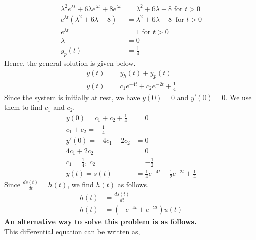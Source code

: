 \documentclass[10pt,a4paper, margin=1in]{article}
\begin{document}
\begin{enumerate}
\begin{enumerate}
\begin{equation}
\begin{split}
		\lambda^2 e^{\lambda t} + 6\lambda e^{\lambda t} + 8 e^{\lambda t}  & = \lambda^2 + 6\lambda + 8 \text{ for } t > 0\\
		e^{\lambda t}(\lambda^2  + 6\lambda + 8) & = \lambda^2 + 6\lambda + 8\ \text{ for } t > 0\\
		e^{\lambda t} & = 1 \text{ for } t > 0\\
		\lambda & = 0 \\
		y_p(t) & = \frac{1}{4} 
	\end{split}
	\end{equation}
	Hence, the general solution is given below.
    	\begin{equation}
	\begin{split}
		y(t) & = y_h(t) + y_p(t)\\
		y(t) & = c_1 e^{-4 t} + c_2 e^{-2 t} + \frac{1}{4}
	\end{split}
	\end{equation}
	Since the system is initially at rest, we have $y(0) = 0$ and $y'(0) = 0$. We use them to find $c_1$ and $c_2$.
    	\begin{equation}
	\begin{split}
		y(0) = c_1 + c_2 + \frac{1}{4} & = 0\\
		c_1 + c_2 = -\frac{1}{4}\\
		y'(0) = -4c_1 - 2c_2 & = 0\\
		4c_1 + 2c_2 & = 0\\
		c_1 = \frac{1}{4}, \ c_2 & = -\frac{1}{2}\\
		y(t) = s(t) & = \frac{1}{4} e^{-4 t} - \frac{1}{2} e^{-2 t} + \frac{1}{4}
	\end{split}
	\end{equation}
	Since $\frac{ds(t)}{dt} = h(t)$, we find $h(t)$ as follows.
    	\begin{equation}
	\begin{split}
		h(t) & = \frac{ds(t)}{dt}\\
		h(t) &= (-e^{-4 t} + e^{-2 t})u(t)
	\end{split}
	\end{equation}
	\textbf{An alternative way to solve this problem is as follows.} \\
	This differential equation can be written as,
	\begin{equation}
	\begin{split}

\end{split}
\end{equation}
\end{enumerate}
\end{enumerate}
\end{document}
